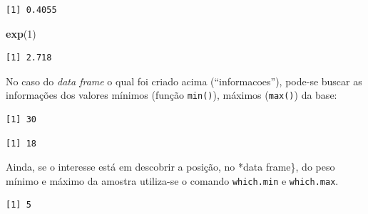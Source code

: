 \documentclass[12pt,portuguese,oneside]{book}
\newenvironment{Shaded}{\begin{snugshade}}{\end{snugshade}}
\newcommand{\KeywordTok}[1]{\textcolor[rgb]{0.13,0.29,0.53}{\textbf{#1}}}
\newcommand{\DecValTok}[1]{\textcolor[rgb]{0.00,0.00,0.81}{#1}}
\newcommand{\CommentTok}[1]{\textcolor[rgb]{0.56,0.35,0.01}{\textit{#1}}}
\newcommand{\OperatorTok}[1]{\textcolor[rgb]{0.81,0.36,0.00}{\textbf{#1}}}
\newcommand{\NormalTok}[1]{#1}
\begin{document}
\begin{verbatim}
[1] 0.4055
\end{verbatim}

\begin{Shaded}
\begin{Highlighting}[]
\KeywordTok{exp}\NormalTok{(}\DecValTok{1}\NormalTok{)}
\end{Highlighting}
\end{Shaded}

\begin{verbatim}
[1] 2.718
\end{verbatim}

No caso do \emph{data frame} o qual foi criado acima (``informacoes''),
pode-se buscar as informações dos valores mínimos (função
\texttt{min()}), máximos (\texttt{max()}) da base:

\begin{Shaded}
\end{Shaded}

\begin{verbatim}
[1] 30
\end{verbatim}

\begin{Shaded}
\end{Shaded}

\begin{verbatim}
[1] 18
\end{verbatim}

Ainda, se o interesse está em descobrir a posição, no *data frame\}, do
peso mínimo e máximo da amostra utiliza-se o comando \texttt{which.min}
e \texttt{which.max}.

\begin{Shaded}
\end{Shaded}

\begin{verbatim}
[1] 5
\end{verbatim}
\end{document}
